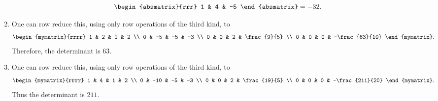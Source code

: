 \begin{ex}
\begin{sol}
\begin{enumerate}
\begin{equation*}
\begin{absmatrix}{rrr}
          1 & 4 & -5
        \end{absmatrix} = -32.
      \end{equation*}
    \item One can row reduce this, using only row operations of the
      third kind, to
      \begin{equation*}
        \def\arraystretch{1.2}
        \begin{mymatrix}{rrrr}
          1 & 2 & 1 & 2 \\
          0 & -5 & -5 & -3 \\
          0 & 0 & 2 & \frac{9}{5} \\
          0 & 0 & 0 & -\frac{63}{10}
        \end{mymatrix}.
      \end{equation*}
      Therefore, the determinant is $63$.
    \item One can row reduce this, using only row operations of the
      third kind, to
      \begin{equation*}
        \def\arraystretch{1.2}
        \begin{mymatrix}{rrrr}
          1 & 4 & 1 & 2 \\
          0 & -10 & -5 & -3 \\
          0 & 0 & 2 & \frac{19}{5} \\
          0 & 0 & 0 & -\frac{211}{20}
        \end{mymatrix}.
      \end{equation*}
      Thus the determinant is $211$.
    \end{enumerate}
  \end{sol}
\end{ex}

